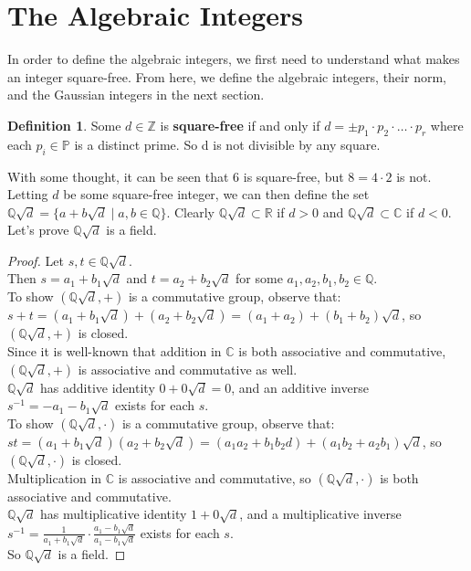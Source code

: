 \documentclass[11pt]{amsart}
\theoremstyle{definition}
\newtheorem{definition}[theorem]{Definition}
\newcommand{\complexNumbers}{\mathbb{C}}
\newcommand{\reals}{\mathbb{R}}
\newcommand{\rationals}{\mathbb{Q}}
\newcommand{\integers}{\mathbb{Z}}
\newcommand{\primes}{\mathbb{P}}
\newcommand{\qd}{\mathbb{Q}\sqrt{d}}
\begin{document}
\section{The Algebraic Integers}
In order to define the algebraic integers, we first need to understand what makes an integer square-free. From here, we define the algebraic
integers, their norm, and the Gaussian integers in the next section.
\begin{definition}
	Some $d \in \integers$ is \textbf{square-free} if and only if $d = \pm p_1 \cdot p_2 \cdot \dots \cdot p_r$ where each $p_i \in \primes$ is
	a distinct prime. So d is not divisible by any square.
\end{definition}
With some thought, it can be seen that 6 is square-free, but $8 = 4 \cdot 2$ is not. Letting $d$ be some square-free integer, we can then define
the set $\qd = \{ a + b\sqrt{d} \mid a, b \in \rationals \}$. Clearly $\qd \subset \reals$ if $d > 0$ and $\qd \subset \complexNumbers $ if $d < 0$.
Let's prove $\qd$ is a field.
\begin{proof}

	Let $s, t \in \qd$. \\
	Then $s = a_1 + b_1\sqrt{d}$ and $t = a_2 + b_2\sqrt{d}$ for some $a_1, a_2, b_1, b_2 \in \rationals$. \\
	To show $(\qd, +)$ is a commutative group, observe that: \\
	$s + t = (a_1 + b_1\sqrt{d}) + (a_2 + b_2\sqrt{d}) = (a_1 + a_2) + (b_1 + b_2)\sqrt{d}$, so $(\qd, +)$ is closed. \\
	Since it is well-known that addition in $\complexNumbers$ is both associative and commutative, $(\qd, +)$ is associative and
	commutative as well. \\
	$\qd$ has additive identity $0 + 0\sqrt{d} = 0$, and an additive inverse $s^{-1} = -a_1 - b_1\sqrt{d}$ exists for each $s$. \\
	To show $(\qd, \cdot)$ is a commutative group, observe that: \\
	$st = (a_1 + b_1\sqrt{d})(a_2 + b_2\sqrt{d}) = (a_1a_2 + b_1b_2d) + (a_1b_2 + a_2b_1)\sqrt{d}$, so $(\qd, \cdot)$ is closed. \\
	Multiplication in $\complexNumbers$ is associative and commutative, so $(\qd, \cdot)$ is both associative and commutative. \\
	$\qd$ has multiplicative identity $1 + 0\sqrt{d}$, and a multiplicative inverse 
	$s^{-1} = \frac{1}{a_1 + b_1\sqrt{d}} \cdot \frac{a_1 - b_1\sqrt{d}}{a_1 - b_1\sqrt{d}}$ exists for each $s$. \\
	So $\qd$ is a field.
\end{proof}
\end{document}
